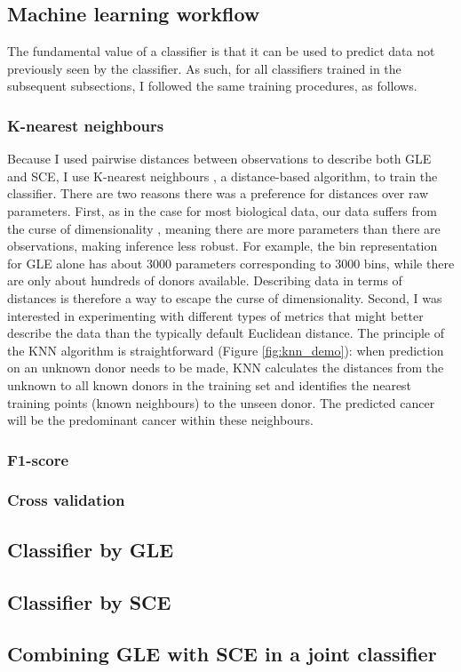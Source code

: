 \subsection{Machine learning workflow}
The fundamental value of a classifier is that it can be used to predict data not previously seen by the classifier. As such, for all classifiers trained in the subsequent subsections, I followed the same training procedures, as follows. 

\subsubsection{K-nearest neighbours}
Because I used pairwise distances between observations to describe both GLE and SCE, I use K-nearest neighbours \citep[KNN;][]{Neath2010DiscriminationClassification}, a distance-based algorithm, to train the classifier. There are two reasons there was a preference for distances over raw parameters. First, as in the case for most biological data, our data suffers from the curse of dimensionality \citep{Banks2003DataStatistics}, meaning there are more parameters than there are observations, making inference less robust. For example, the bin representation for GLE alone has about 3000 parameters corresponding to 3000 bins, while there are only about hundreds of donors available. Describing data in terms of distances is therefore a way to escape the curse of dimensionality. Second, I was interested in experimenting with different types of metrics that might better describe the data than the typically default Euclidean distance. The principle of the KNN algorithm is straightforward (Figure \ref{fig:knn_demo}): when prediction on an unknown donor needs to be made, KNN calculates the distances from the unknown to all known donors in the training set and identifies the nearest training points (known neighbours) to the unseen donor. The predicted cancer will be the predominant cancer within these neighbours.

\subsubsection{F1-score}
\subsubsection{Cross validation}

\subsection{Classifier by GLE}
\subsection{Classifier by SCE}
\subsection{Combining GLE with SCE in a joint classifier}

